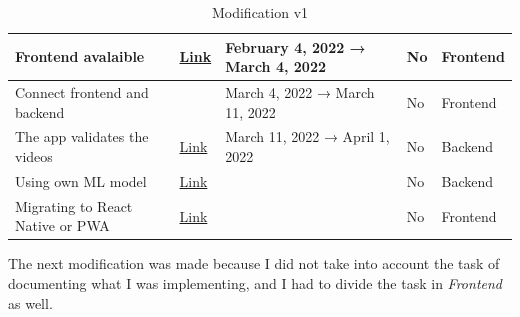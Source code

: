 \begin{table}[H]
{\begin{tabular}{|l|l|l|l|l|}
        \hline           Frontend avalaible                             & \href{https://github.com/JesusGonzalezA/LearnASL/milestone/3}{Link}    &       February 4, 2022  → March 4, 2022        & No    & Frontend  \\
        \hline           Connect frontend and backend                   &                                                         &       March 4, 2022     → March 11, 2022          & No    & Frontend  \\
        \hline           The app validates the videos                   & \href{https://github.com/JesusGonzalezA/LearnASL/milestone/5}{Link}    &       March 11, 2022    → April 1, 2022          & No    & Backend   \\
        \hline           Using own ML model                             & \href{https://github.com/JesusGonzalezA/LearnASL/milestone/10}{Link}   &                                               & No    & Backend   \\
        \hline           Migrating to React Native or PWA               & \href{https://github.com/JesusGonzalezA/LearnASL/milestone/9}{Link}    &                                               & No    & Frontend  \\
        \hline
    \end{tabular}
    }
\caption{Modification v1}
\label{table:planification_real_v1}
\end{table}

The next modification was made because I did not take into account the task of documenting what I was implementing, and I had to divide the task in \textit{Frontend} as well. \\

